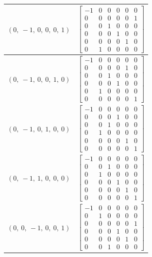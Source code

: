 \documentclass[11pt]{article}
\theoremstyle{definition}
\begin{document}
\begin{longtable}{|l|c|}
    \hline
    $\left( 0, \  -1, \  0, \  0, \  0, \  1\right)$ & ${\left[\begin{matrix}-1 & 0 & 0 & 0 & 0 & 0\\0 & 0 & 0 & 0 & 0 & 1\\0 & 0 & 1 & 0 & 0 & 0\\0 & 0 & 0 & 1 & 0 & 0\\0 & 0 & 0 & 0 & 1 & 0\\0 & 1 & 0 & 0 & 0 & 0\end{matrix}\right]}$ \\
    \hline
    $\left( 0, \  -1, \  0, \  0, \  1, \  0\right)$ & ${\left[\begin{matrix}-1 & 0 & 0 & 0 & 0 & 0\\0 & 0 & 0 & 0 & 1 & 0\\0 & 0 & 1 & 0 & 0 & 0\\0 & 0 & 0 & 1 & 0 & 0\\0 & 1 & 0 & 0 & 0 & 0\\0 & 0 & 0 & 0 & 0 & 1\end{matrix}\right]}$ \\
    \hline
    $\left( 0, \  -1, \  0, \  1, \  0, \  0\right)$ & ${\left[\begin{matrix}-1 & 0 & 0 & 0 & 0 & 0\\0 & 0 & 0 & 1 & 0 & 0\\0 & 0 & 1 & 0 & 0 & 0\\0 & 1 & 0 & 0 & 0 & 0\\0 & 0 & 0 & 0 & 1 & 0\\0 & 0 & 0 & 0 & 0 & 1\end{matrix}\right]}$ \\
    \hline
    $\left( 0, \  -1, \  1, \  0, \  0, \  0\right)$ & ${\left[\begin{matrix}-1 & 0 & 0 & 0 & 0 & 0\\0 & 0 & 1 & 0 & 0 & 0\\0 & 1 & 0 & 0 & 0 & 0\\0 & 0 & 0 & 1 & 0 & 0\\0 & 0 & 0 & 0 & 1 & 0\\0 & 0 & 0 & 0 & 0 & 1\end{matrix}\right]}$ \\
    \hline
    $\left( 0, \  0, \  -1, \  0, \  0, \  1\right)$ & ${\left[\begin{matrix}-1 & 0 & 0 & 0 & 0 & 0\\0 & 1 & 0 & 0 & 0 & 0\\0 & 0 & 0 & 0 & 0 & 1\\0 & 0 & 0 & 1 & 0 & 0\\0 & 0 & 0 & 0 & 1 & 0\\0 & 0 & 1 & 0 & 0 & 0\end{matrix}\right]}$ \\

\end{longtable}
\end{document}

